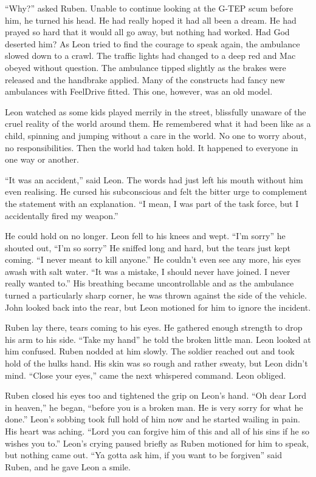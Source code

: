 ``Why?'' asked Ruben.  Unable to continue looking at the G-TEP scum before him, he turned his head.  He had really hoped it had all been a dream.  He had prayed so hard that it would all go away, but nothing had worked.  Had God deserted him?  As Leon tried to find the courage to speak again, the ambulance slowed down to a crawl.  The traffic lights had changed to a deep red and Mac obeyed without question.  The ambulance tipped slightly as the brakes were released and the handbrake applied.  Many of the constructs had fancy new ambulances with FeelDrive fitted.  This one, however, was an old model.

Leon watched as some kids played merrily in the street, blissfully unaware of the cruel reality of the world around them.  He remembered what it had been like as a child, spinning and jumping without a care in the world.  No one to worry about, no responsibilities.  Then the world had taken hold.  It happened to everyone in one way or another.  

``It was an accident,'' said Leon.  The words had just left his mouth without him even realising.  He cursed his subconscious and felt the bitter urge to complement the statement with an explanation.  ``I mean, I was part of the task force, but I accidentally fired my weapon.''

He could hold on no longer.  Leon fell to his knees and wept.  ``I'm sorry'' he shouted out, ``I'm so sorry''  He sniffed long and hard, but the tears just kept coming.  ``I never meant to kill anyone.''  He couldn't even see any more, his eyes awash with salt water.  ``It was a mistake, I should never have joined.  I never really wanted to.''  His breathing became uncontrollable and as the ambulance turned a particularly sharp corner, he was thrown against the side of the vehicle.  John looked back into the rear, but Leon motioned for him to ignore the incident.

Ruben lay there, tears coming to his eyes.  He gathered enough strength to drop his arm to his side.  ``Take my hand'' he told the broken little man.  Leon looked at him confused.  Ruben nodded at him slowly.  The soldier reached out and took hold of the hulks hand.  His skin was so rough and rather sweaty, but Leon didn't mind.  ``Close your eyes,'' came the next whispered command.  Leon obliged.

Ruben closed his eyes too and tightened the grip on Leon's hand.  ``Oh dear Lord in heaven,'' he began, ``before you is a broken man.  He is very sorry for what he done.''  Leon's sobbing took full hold of him now and he started wailing in pain.  His heart was aching.  ``Lord you can forgive him of this and all of his sins if he so wishes you to.''  Leon's crying paused briefly as Ruben motioned for him to speak, but nothing came out.  ``Ya gotta ask him, if you want to be forgiven'' said Ruben, and he gave Leon a smile.

